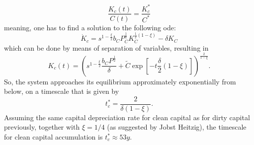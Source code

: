 \begin{equation}
	\frac{K_c(t)}{C(t)} = \frac{K^*_c}{C^*}
\end{equation}
meaning, one has to find a solution to the following ode:
\begin{equation}
	\dot{K}_c = s^{1-\frac{\xi}{2}} b_C P_C^{\frac{1}{2}}K_C^{\frac{1}{2}(1-\xi)} - \delta K_C
	\label{eq:learning_trajectory_ode}
\end{equation}
which can be done by means of separation of variables, resulting in
\begin{equation}
	K_c(t) = \left( s^{1-\frac{\xi}{2}}\frac{b_C P^{\frac{1}{2}}}{\delta} + \tilde{C} \exp\left[ -t \frac{\delta}{2}(1-\xi) \right] \right)^{\frac{2}{1-\xi}}.
	\label{eq:learning_trajectory_solution}
\end{equation}
So, the system approaches its equilibrium approximately exponentially from below, on a timescale that is given by
\begin{equation}
	t_c^* = \frac{2}{\delta(1-\xi)}
	\label{eq_learning_equilibrium_timescale}.
\end{equation}
Assuming the same capital depreciation rate for clean capital as for dirty capital previously, together with $\xi = 1/4$ (as suggested by Jobst Heitzig), the timescale for clean capital accumulation is $t^*_c \approx 53 y$.
